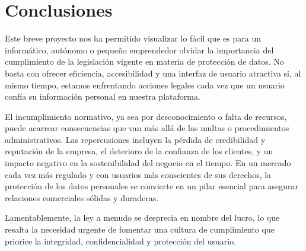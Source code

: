 \section{Conclusiones}
Este breve proyecto nos ha permitido visualizar lo fácil que es para un informático, autónomo o pequeño emprendedor olvidar la importancia del cumplimiento de la legislación vigente en materia de protección de datos. No basta con ofrecer eficiencia, accesibilidad y una interfaz de usuario atractiva si, al mismo tiempo, estamos enfrentando acciones legales cada vez que un usuario confía su información personal en nuestra plataforma.

El incumplimiento normativo, ya sea por desconocimiento o falta de recursos, puede acarrear consecuencias que van más allá de las multas o procedimientos administrativos. Las repercusiones incluyen la pérdida de credibilidad y reputación de la empresa, el deterioro de la confianza de los clientes, y un impacto negativo en la sostenibilidad del negocio en el tiempo. En un mercado cada vez más regulado y con usuarios más conscientes de sus derechos, la protección de los datos personales se convierte en un pilar esencial para asegurar relaciones comerciales sólidas y duraderas.

Lamentablemente, la ley a menudo se desprecia en nombre del lucro, lo que resalta la necesidad urgente de fomentar una cultura de cumplimiento que priorice la integridad, confidencialidad y protección del usuario.